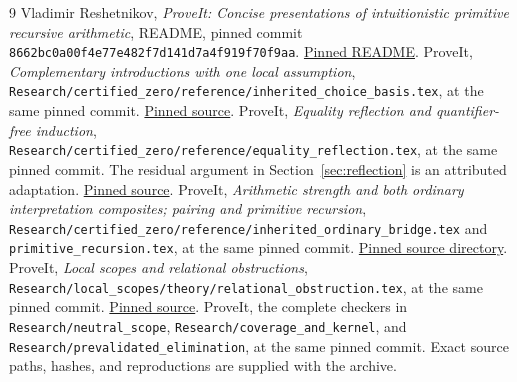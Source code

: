 \documentclass[11pt,letterpaper]{article}
\theoremstyle{definition}\newtheorem{definition}[theorem]{Definition}
\theoremstyle{remark}\newtheorem{remark}[theorem]{Remark}
\newcommand{\file}[1]{{\small\nolinkurl{#1}}}
\begin{document}
\begin{thebibliography}{9}
Vladimir Reshetnikov, \emph{ProveIt: Concise presentations of
intuitionistic primitive recursive arithmetic}, README, pinned commit
\texttt{8662bc0a00f4e77e482f7d141d7a4f919f70f9aa}.
\href{https://github.com/VladimirReshetnikov/ProveIt/blob/8662bc0a00f4e77e482f7d141d7a4f919f70f9aa/Logic/PrimitiveRecursiveArithmetic/ConciseIPRA/README.md}{Pinned README}.
ProveIt, \emph{Complementary introductions with one local assumption},
\file{Research/certified_zero/reference/inherited_choice_basis.tex},
at the same pinned commit.
\href{https://github.com/VladimirReshetnikov/ProveIt/blob/8662bc0a00f4e77e482f7d141d7a4f919f70f9aa/Logic/PrimitiveRecursiveArithmetic/ConciseIPRA/Research/certified_zero/reference/inherited_choice_basis.tex}{Pinned source}.
ProveIt, \emph{Equality reflection and quantifier-free induction},
\file{Research/certified_zero/reference/equality_reflection.tex},
at the same pinned commit. The residual argument in
Section~\ref{sec:reflection} is an attributed adaptation.
\href{https://github.com/VladimirReshetnikov/ProveIt/blob/8662bc0a00f4e77e482f7d141d7a4f919f70f9aa/Logic/PrimitiveRecursiveArithmetic/ConciseIPRA/Research/certified_zero/reference/equality_reflection.tex}{Pinned source}.
ProveIt, \emph{Arithmetic strength and both ordinary interpretation
composites; pairing and primitive recursion},
\file{Research/certified_zero/reference/inherited_ordinary_bridge.tex}
and \file{primitive_recursion.tex}, at the same pinned commit.
\href{https://github.com/VladimirReshetnikov/ProveIt/tree/8662bc0a00f4e77e482f7d141d7a4f919f70f9aa/Logic/PrimitiveRecursiveArithmetic/ConciseIPRA/Research/certified_zero/reference}{Pinned source directory}.
ProveIt, \emph{Local scopes and relational obstructions},
\file{Research/local_scopes/theory/relational_obstruction.tex},
at the same pinned commit.
\href{https://github.com/VladimirReshetnikov/ProveIt/blob/8662bc0a00f4e77e482f7d141d7a4f919f70f9aa/Logic/PrimitiveRecursiveArithmetic/ConciseIPRA/Research/local_scopes/theory/relational_obstruction.tex}{Pinned source}.
ProveIt, the complete checkers in \file{Research/neutral_scope},
\file{Research/coverage_and_kernel}, and
\file{Research/prevalidated_elimination}, at the same pinned commit.
Exact source paths, hashes, and reproductions are supplied with the archive.
\end{thebibliography}
\end{document}
